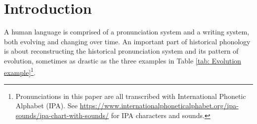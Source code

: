 \section{Introduction}
    A human language is comprised of a pronunciation system and a writing system, both evolving and changing over time. An important part of historical phonology is about reconstructing the historical pronunciation system and its pattern of evolution, sometimes as drastic as the three examples in Table \ref{tab: Evolution example}\footnote{Pronunciations in this paper are all transcribed with International Phonetic Alphabet (IPA). See \href{https://www.internationalphoneticalphabet.org/ipa-sounds/ipa-chart-with-sounds/}{https://www.internationalphoneticalphabet.org/ipa-sounds/ipa-chart-with-sounds/} for IPA characters and sounds.}. 
    \begin{table}[ht]
    \centering
    \small
    \caption{Reconstructed pronunciations (in IPA) of three characters over 6 Chinese historical periods: MiddleTang - T, LateTang - L, Song - S, Yuan - Y, MingQing - Q and Modern - M. See  for corresponding timeline.}
    \label{tab: Evolution example}
    \end{table}
